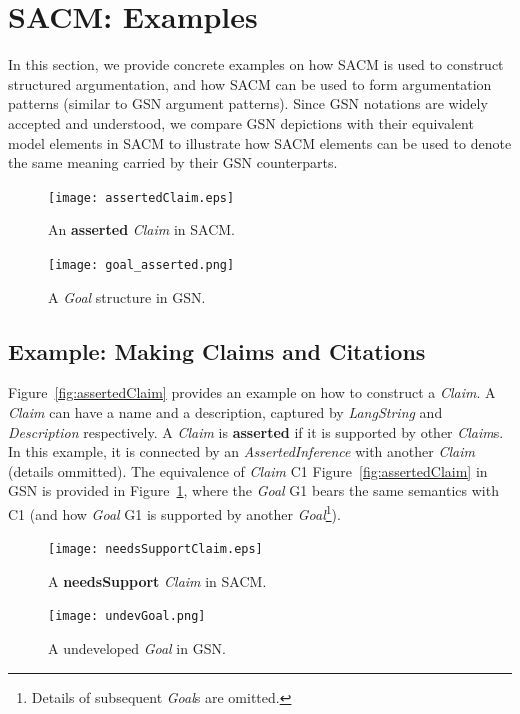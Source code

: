 \section{SACM: Examples}
In this section, we provide concrete examples on how SACM is used to construct structured argumentation, and how SACM can be used to form argumentation patterns (similar to GSN argument patterns). 
Since GSN notations are widely accepted and understood, we compare GSN depictions with their equivalent model elements in SACM to illustrate how SACM elements can be used to denote the same meaning carried by their GSN counterparts.

\begin{figure}
	\centering
	\begin{minipage}[b]{0.7\textwidth}
		\texttt{[image: assertedClaim.eps]}
		\caption{An \textbf{asserted} \textit{Claim} in SACM.}
		\label{fig:assertedClaim}
	\end{minipage}
	\hfill
	\begin{minipage}[b]{0.28\textwidth}
		\texttt{[image: goal\_asserted.png]}
		\caption{A \textit{Goal} structure in GSN.}
		\label{fig:goalingsn}
	\end{minipage}
\end{figure}

\subsection{Example: Making Claims and Citations}
\label{sec:claims}

Figure~\ref{fig:assertedClaim} provides an example on how to construct a \textit{Claim}. 
A \textit{Claim} can have a name and a description, captured by \textit{LangString} and \textit{Description} respectively. 
A \textit{Claim} is \textbf{asserted} if it is supported by other \textit{Claim}s. 
In this example, it is connected by an \textit{AssertedInference} with another \textit{Claim} (details ommitted). 
The equivalence of \textit{Claim} C1 Figure~\ref{fig:assertedClaim} in GSN is provided in Figure~\ref{fig:goalingsn}, where the \textit{Goal} G1 bears the same semantics with C1 (and how \textit{Goal} G1 is supported by another \textit{Goal}\footnote{Details of subsequent \textit{Goal}s are omitted.}).

\begin{figure}
	\centering
	\begin{minipage}[b]{0.7\textwidth}
		\texttt{[image: needsSupportClaim.eps]}
		\caption{A \textbf{needsSupport} \textit{Claim} in SACM.}
		\label{fig:needsSupportClaim}
	\end{minipage}
	\hfill
	\begin{minipage}[b]{0.28\textwidth}
		\texttt{[image: undevGoal.png]}
		\caption{A undeveloped \textit{Goal} in GSN.}
		\label{fig:undevGoal}
	\end{minipage}
\end{figure}

